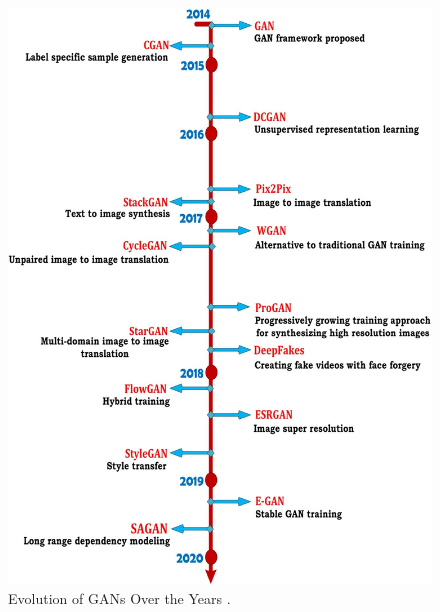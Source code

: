 \begin{figure}
        \begin{center}
 	    \includegraphics[scale=0.25]{images/relatedWorks/GANEvolution.jpg}
	    \caption[Evolution of \acp{GAN} Over the Years.]{Evolution of \acp{GAN} Over the Years \cite{PavanKumar.2021}.}
	    \label{fig:GANEvolution}
	    \end{center}
\end{figure}




